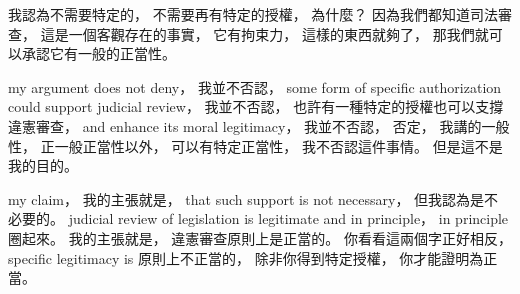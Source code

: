 \hypertarget{w02:cue:607}{}我認為不需要特定的，
\hypertarget{w02:cue:608}{}不需要再有特定的授權，
\hypertarget{w02:cue:609}{}為什麼？
\hypertarget{w02:cue:610}{}因為我們都知道司法審查，
\hypertarget{w02:cue:611}{}這是一個客觀存在的事實，
\hypertarget{w02:cue:612}{}它有拘束力，
\hypertarget{w02:cue:613}{}這樣的東西就夠了，
\hypertarget{w02:cue:614}{}那我們就可以承認它有一般的正當性。

\hypertarget{w02:cue:615}{}my argument does not deny，
\hypertarget{w02:cue:616}{}我並不否認，
\hypertarget{w02:cue:617}{}some form of specific authorization could support judicial review，
\hypertarget{w02:cue:618}{}我並不否認，
\hypertarget{w02:cue:619}{}也許有一種特定的授權也可以支撐違憲審查，
\hypertarget{w02:cue:620}{}and enhance its moral legitimacy，
\hypertarget{w02:cue:621}{}我並不否認，
\hypertarget{w02:cue:622}{}否定，
\hypertarget{w02:cue:623}{}我講的一般性，
\hypertarget{w02:cue:624}{}正一般正當性以外，
\hypertarget{w02:cue:625}{}可以有特定正當性，
\hypertarget{w02:cue:626}{}我不否認這件事情。
\hypertarget{w02:cue:627}{}但是這不是我的目的。

\hypertarget{w02:cue:628}{}my claim，
\hypertarget{w02:cue:629}{}我的主張就是，
\hypertarget{w02:cue:630}{}that such support is not necessary，
\hypertarget{w02:cue:631}{}但我認為是不必要的。
\hypertarget{w02:cue:632}{}judicial review of legislation is legitimate and in principle，
\hypertarget{w02:cue:633}{}in principle 圈起來。
\hypertarget{w02:cue:634}{}我的主張就是，
\hypertarget{w02:cue:635}{}違憲審查原則上是正當的。
\hypertarget{w02:cue:636}{}你看看這兩個字正好相反，
\hypertarget{w02:cue:637}{}specific legitimacy is 原則上不正當的，
\hypertarget{w02:cue:638}{}除非你得到特定授權，
\hypertarget{w02:cue:639}{}你才能證明為正當。


